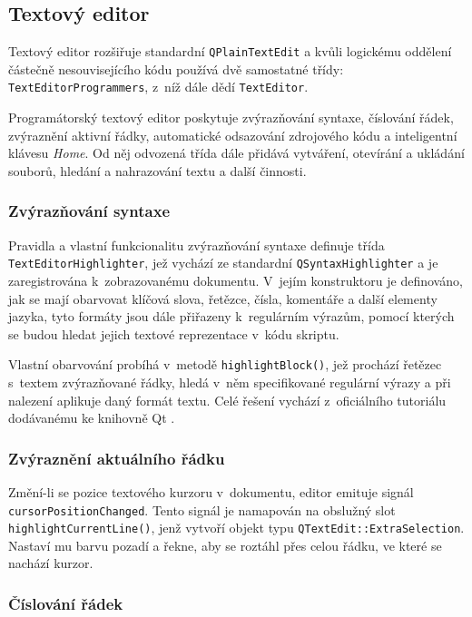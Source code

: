 \documentclass[11pt,twoside,a4paper]{book}
\begin{document}
\subsection{Textový editor}

Textový editor rozšiřuje standardní \texttt{QPlainTextEdit} a kvůli logickému oddělení částečně nesouvisejícího kódu používá dvě samostatné třídy: \texttt{TextEditorProgrammers}, z~níž dále dědí \texttt{TextEditor}.

Programátorský textový editor poskytuje zvýrazňování syntaxe, číslování řádek, zvýraznění aktivní řádky, automatické odsazování zdrojového kódu a inteligentní klávesu \textit{Home}. Od něj odvozená třída dále přidává vytváření, otevírání a ukládání souborů, hledání a nahrazování textu a další činnosti.


\subsubsection{Zvýrazňování syntaxe}

Pravidla a vlastní funkcionalitu zvýrazňování syntaxe definuje třída \texttt{Text\-E\-di\-tor\-High\-ligh\-ter}, jež vychází ze standardní \texttt{QSyntaxHighlighter} a je zaregistrována k~zobrazovanému dokumentu. V~jejím konstruktoru je definováno, jak se mají obarvovat klíčová slova, řetězce, čísla, komentáře a další elementy jazyka, tyto formáty jsou dále přiřazeny k~regulárním výrazům, pomocí kterých se budou hledat jejich textové reprezentace v~kódu skriptu.

Vlastní obarvování probíhá v~metodě \texttt{highlightBlock()}, jež prochází řetězec s~textem zvýrazňované řádky, hledá v~něm specifikované regulární výrazy a při nalezení aplikuje daný formát textu. Celé řešení vychází z~oficiálního tutoriálu dodávanému ke knihovně Qt \cite{syntax_highlighter_example}.


\subsubsection{Zvýraznění aktuálního řádku}

Změní-li se pozice textového kurzoru v~dokumentu, editor emituje signál \texttt{cur\-sor\-Po\-si\-ti\-on\-Chan\-ged}. Tento signál je namapován na obslužný slot \texttt{highlightCurrentLine()}, jenž vytvoří objekt typu \texttt{QTextEdit::ExtraSelection}. Nastaví mu barvu pozadí a řekne, aby se roztáhl přes celou řádku, ve které se nachází kurzor.


\subsubsection{Číslování řádek}
\end{document}
